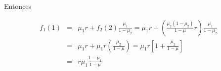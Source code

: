 Entonces

\begin{eqnarray*}
f_{1}\left(1\right)&=&\mu_{1}r+f_{2}\left(2\right)\frac{\mu_{1}}{1-\mu_{2}}=\mu_{1}r+\left(\frac{\mu_{2}\left(1-\mu_{2}\right)}{1-\mu}r\right)\frac{\mu_{1}}{1-\mu_{2}}\\
&=&\mu_{1}r+\mu_{1}r\left(\frac{\mu_{2}}{1-\mu}\right)=\mu_{1}r\left[1+\frac{\mu_{2}}{1-\mu}\right]\\
&=&r\mu_{1}\frac{1-\mu_{1}}{1-\mu}\\
\end{eqnarray*}


